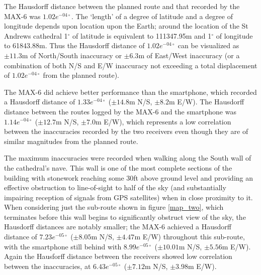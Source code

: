 
The Hausdorff distance between the planned route and that recorded by the MAX-6 was $1.02e^{-04\circ}$. The `length' of a degree of latitude and a degree of longitude depends upon location upon the Earth; around the location of the St Andrews cathedral 1$^\circ$ of latitude is equivalent to 111347.95m and 1$^\circ$ of longitude to 61843.88m. Thus the Hausdorff distance of $1.02e^{-04\circ}$ can be visualized as $\pm11.3$m of North/South inaccuracy or $\pm6.3$m of East/West inaccuracy (or a combination of both N/S and E/W inaccuracy not exceeding a total displacement of $1.02e^{-04\circ}$ from the planned route).

The MAX-6 did achieve better performance than the smartphone, which recorded a Hausdorff distance of $1.33e^{-04\circ}$ ($\pm14.8$m N/S, $\pm8.2$m E/W). The Hausdorff distance between the routes logged by the MAX-6 and the smartphone was $1.14e^{-04\circ}$ ($\pm12.7$m N/S, $\pm7.0$m E/W), which represents a low correlation between the inaccuracies recorded by the two receivers even though they are of similar magnitudes from the planned route.

The maximum inaccuracies were recorded when walking along the South wall of the cathedral's nave. This wall is one of the most complete sections of the building with stonework reaching some 30ft above ground level and providing an effective obstruction to line-of-sight to half of the sky (and substantially impairing reception of signals from GPS satellites) when in close proximity to it. When considering just the sub-route shown in figure \ref{map_two}, which terminates before this wall begins to significantly obstruct view of the sky, the Hausdorff distances are notably smaller; the MAX-6 achieved a Hausdorff distance of $7.23e^{-05\circ}$ ($\pm8.05$m N/S, $\pm4.47$m E/W) throughout this sub-route, with the smartphone still behind with $8.99e^{-05\circ}$ ($\pm10.01$m N/S, $\pm5.56$m E/W). Again the Hausforff distance between the receivers showed low correlation between the inaccuracies, at $6.43e^{-05\circ}$ ($\pm7.12$m N/S, $\pm3.98$m E/W).
 
